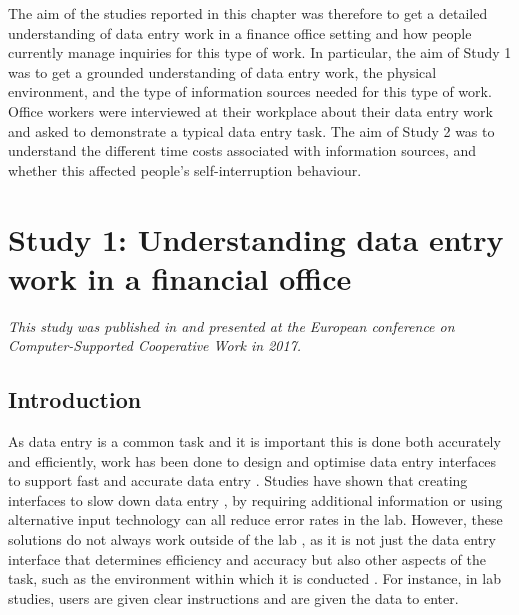 The aim of the studies reported in this chapter was therefore to get a detailed understanding of data entry work in a finance office setting and how people currently manage inquiries for this type of work. In particular, the aim of Study 1 was to get a grounded understanding of data entry work, the physical environment, and the type of information sources needed for this type of work. Office workers were interviewed at their workplace about their data entry work and asked to demonstrate a typical data entry task. The aim of Study 2 was to understand the different time costs associated with information sources, and whether this affected people's self-interruption behaviour. %

\section{Study 1: Understanding data entry work in a financial office}\label{st:Study1}
 
\textit{This study was published in \citet{Borghouts2017} and presented at the European conference on Computer-Supported Cooperative Work in 2017.}
 
\subsection{Introduction}
As data entry is a common task and it is important this is done both accurately and efficiently, work has been done to design and optimise data entry interfaces to support fast and accurate data entry \citep[e.g.][]{Oladimeji2013, Vertanen2015, Wiseman2013a}. Studies have shown that creating interfaces to slow down data entry \citep{Gould2016b}, by requiring additional information \citep{Wiseman2013a} or using alternative input technology \citep{Oladimeji2011} can all reduce error rates in the lab. However, these solutions do not always work outside of the lab \citep[e.g.][]{Gould2016b}, as it is not just the data entry interface that determines efficiency and accuracy but also other aspects of the task, such as the environment within which it is conducted \citep{Payne2013, Randall2014}. For instance, in lab studies, users are given clear instructions and are given the data to enter. 

